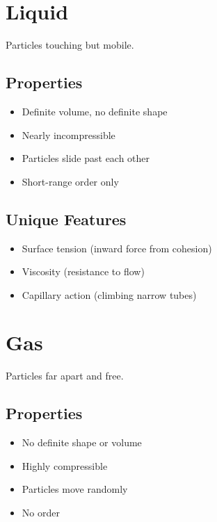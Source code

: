 \documentclass[
  11pt,
  letterpaper,
  twoside,
  openright]{book}
\providecommand{\tightlist}{%
  \setlength{\itemsep}{0pt}\setlength{\parskip}{0pt}}
\begin{document}
\section{Liquid}\label{liquid}

Particles touching but mobile.

\subsection{Properties}\label{properties-2}

\begin{itemize}
\tightlist
\item
  Definite volume, no definite shape
\item
  Nearly incompressible
\item
  Particles slide past each other
\item
  Short-range order only
\end{itemize}

\subsection{Unique Features}\label{unique-features}

\begin{itemize}
\tightlist
\item
  Surface tension (inward force from cohesion)
\item
  Viscosity (resistance to flow)
\item
  Capillary action (climbing narrow tubes)
\end{itemize}

\section{Gas}\label{gas}

Particles far apart and free.

\subsection{Properties}\label{properties-3}

\begin{itemize}
\tightlist
\item
  No definite shape or volume
\item
  Highly compressible
\item
  Particles move randomly
\item
  No order
\end{itemize}
\end{document}
